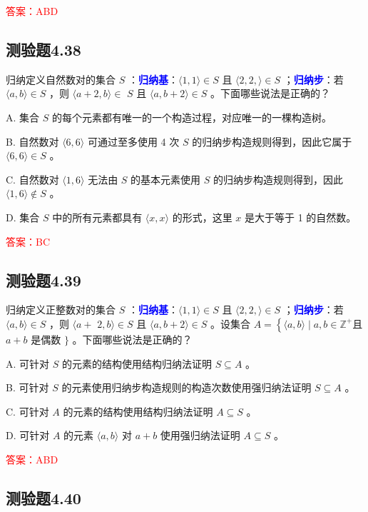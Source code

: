 \documentclass[UTF8, heading=true]{ctexart}
\begin{document}
\textcolor{red}{答案：ABD}

\subsection{测验题4.38}

归纳定义自然数对的集合 $S$ ：\textcolor{blue}{\textbf{归纳基}}：$\langle 1,1\rangle \in S$ 且 $\langle 2,2,\rangle \in S$ ；\textcolor{blue}{\textbf{归纳步}}：若 $\langle a, b\rangle \in S$ ，则 $\langle a+2, b\rangle \in$ $S$ 且 $\langle a, b+2\rangle \in S$ 。下面哪些说法是正确的？

A. 集合 $S$ 的每个元素都有唯一的一个构造过程，对应唯一的一棵构造树。

B. 自然数对 $\langle 6,6\rangle$ 可通过至多使用 4 次 $S$ 的归纳步构造规则得到，因此它属于 $\langle 6,6\rangle \in S$ 。

C. 自然数对 $\langle 1,6\rangle$ 无法由 $S$ 的基本元素使用 $S$ 的归纳步构造规则得到，因此 $\langle 1,6\rangle \notin S$ 。

D. 集合 $S$ 中的所有元素都具有 $\langle x, x\rangle$ 的形式，这里 $x$ 是大于等于 1 的自然数。

\textcolor{red}{答案：BC}


\subsection{测验题4.39}

归纳定义正整数对的集合 $S$ ：\textcolor{blue}{\textbf{归纳基}}：$\langle 1,1\rangle \in S$ 且 $\langle 2,2,\rangle \in S$ ；\textcolor{blue}{\textbf{归纳步}}：若 $\langle a, b\rangle \in S$ ，则 $\langle a+$ $2, b\rangle \in S$ 且 $\langle a, b+2\rangle \in S$ 。设集合 $A=\left\{\langle a, b\rangle \mid a, b \in \mathbb{Z}^{+}\right.$且 $a+b$ 是偶数 $\}$ 。下面哪些说法是正确的？

A. 
可针对 $S$ 的元素的结构使用结构归纳法证明 $S \subseteq A$ 。

B. 
可针对 $S$ 的元素使用归纳步构造规则的构造次数使用强归纳法证明 $S \subseteq A$ 。

C. 
可针对 $A$ 的元素的结构使用结构归纳法证明 $A \subseteq S$ 。

D. 
可针对 $A$ 的元素 $\langle a, b\rangle$ 对 $a+b$ 使用强归纳法证明 $A \subseteq S$ 。

\textcolor{red}{答案：ABD}

\subsection{测验题4.40}
\end{document}
